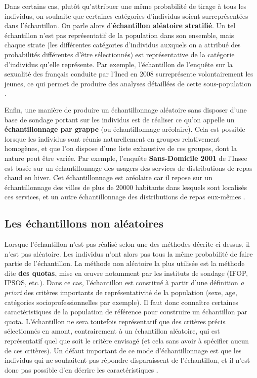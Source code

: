 \documentclass[
]{book}
\begin{document}
Dans certains cas, plutôt qu'attribuer une même probabilité de tirage à tous les individus, on souhaite que certaines catégories d'individus soient surreprésentées dans l'échantillon. On parle alors d'\textbf{échantillon aléatoire stratifié}. Un tel échantillon n'est pas représentatif de la population dans son ensemble, mais chaque strate (les différentes catégories d'individus auxquels on a attribué des probabilités différentes d'être sélectionnés) est représentative de la catégorie d'individus qu'elle représente. Par exemple, l'échantillon de l'enquête sur la sexualité des français conduite par l'Ined en 2008 surreprésente volontairement les jeunes, ce qui permet de produire des analyses détaillées de cette sous-population \citep{toulemon2008}.

Enfin, une manière de produire un échantillonnage aléatoire sans disposer d'une base de sondage portant sur les individus est de réaliser ce qu'on appelle un \textbf{échantillonnage par grappe} (ou échantillonnage aréolaire). Cela est possible lorsque les individus sont réunis naturellement en groupes relativement homogènes, et que l'on dispose d'une liste exhaustive de ces groupes, dont la nature peut être variée. Par exemple, l'enquête \textbf{Sans-Domicile 2001} de l'Insee est basée sur un échantillonnage des usagers des services de distributions de repas chaud en hiver. Cet échantillonnage est aréolaire car il repose sur un échantillonnage des villes de plus de 20000 habitants dans lesquels sont localisés ces services, et un autre échantillonnage des distributions de repas eux-mêmes \citep{brousse2005}.

\hypertarget{les-uxe9chantillons-non-aluxe9atoires}{%
\subsection{Les échantillons non aléatoires}\label{les-uxe9chantillons-non-aluxe9atoires}}

Lorsque l'échantillon n'est pas réalisé selon une des méthodes décrite ci-dessus, il n'est pas aléatoire. Les individus n'ont alors pas tous la même probabilité de faire partie de l'échantillon. La méthode non aléatoire la plus utilisée est la méthode dite \textbf{des quotas}, mise en œuvre notamment par les instituts de sondage (IFOP, IPSOS, etc.). Dans ce cas, l'échantillon est constitué à partir d'une définition \emph{a priori} des critères importants de représentativité de la population (sexe, age, catégories socioprofessionnelles par exemple). Il faut donc connaître certaines caractéristiques de la population de référence pour construire un échantillon par quota. L'échantillon ne sera toutefois représentatif que des critères précis sélectionnés en amont, contrairement à un échantillon aléatoire, qui est représentatif quel que soit le critère envisagé (et cela sans avoir à spécifier aucun de ces critères). Un défaut important de ce mode d'échantillonnage est que les individus qui ne souhaitent pas répondre disparaissent de l'échantillon, et il n'est donc pas possible d'en décrire les caractéristiques \citep{lehingue2007}.
\end{document}
